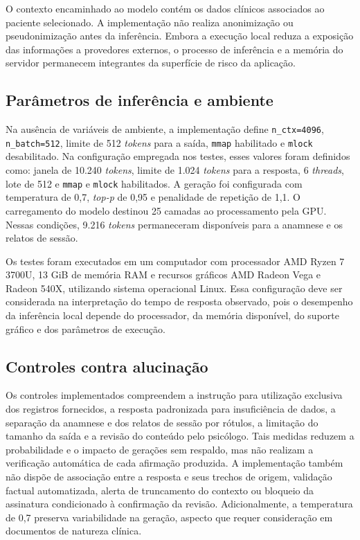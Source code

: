 O contexto encaminhado ao modelo contém os dados clínicos associados ao paciente selecionado. A implementação não realiza anonimização ou pseudonimização antes da inferência. Embora a execução local reduza a exposição das informações a provedores externos, o processo de inferência e a memória do servidor permanecem integrantes da superfície de risco da aplicação.

\subsection{Parâmetros de inferência e ambiente}

Na ausência de variáveis de ambiente, a implementação define \texttt{n\_ctx=4096}, \texttt{n\_batch=512}, limite de 512 \textit{tokens} para a saída, \texttt{mmap} habilitado e \texttt{mlock} desabilitado. Na configuração empregada nos testes, esses valores foram definidos como: janela de 10.240 \textit{tokens}, limite de 1.024 \textit{tokens} para a resposta, 6 \textit{threads}, lote de 512 e \texttt{mmap} e \texttt{mlock} habilitados. A geração foi configurada com temperatura de 0,7, \textit{top-p} de 0,95 e penalidade de repetição de 1,1. O carregamento do modelo destinou 25 camadas ao processamento pela GPU. Nessas condições, 9.216 \textit{tokens} permaneceram disponíveis para a anamnese e os relatos de sessão.

Os testes foram executados em um computador com processador AMD Ryzen 7 3700U, 13 GiB de memória RAM e recursos gráficos AMD Radeon Vega e Radeon 540X, utilizando sistema operacional Linux. Essa configuração deve ser considerada na interpretação do tempo de resposta observado, pois o desempenho da inferência local depende do processador, da memória disponível, do suporte gráfico e dos parâmetros de execução.

\subsection{Controles contra alucinação}

Os controles implementados compreendem a instrução para utilização exclusiva dos registros fornecidos, a resposta padronizada para insuficiência de dados, a separação da anamnese e dos relatos de sessão por rótulos, a limitação do tamanho da saída e a revisão do conteúdo pelo psicólogo. Tais medidas reduzem a probabilidade e o impacto de gerações sem respaldo, mas não realizam a verificação automática de cada afirmação produzida. A implementação também não dispõe de associação entre a resposta e seus trechos de origem, validação factual automatizada, alerta de truncamento do contexto ou bloqueio da assinatura condicionado à confirmação da revisão. Adicionalmente, a temperatura de 0,7 preserva variabilidade na geração, aspecto que requer consideração em documentos de natureza clínica.

